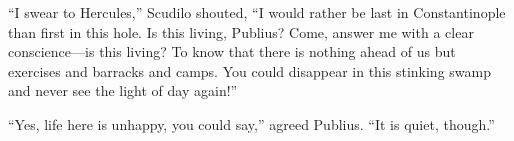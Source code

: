 ``I swear to Hercules,'' Scudilo shouted, ``I would rather be last in
Constantinople than first in this hole. Is this living, Publius? Come,
answer me with a clear conscience---is this living? To know that there
is nothing ahead of us but exercises and barracks and camps. You could
disappear in this stinking swamp and never see the light of day
again!'' %

``Yes, life here is unhappy, you could say,'' agreed Publius. ``It is
quiet, though.'' %

